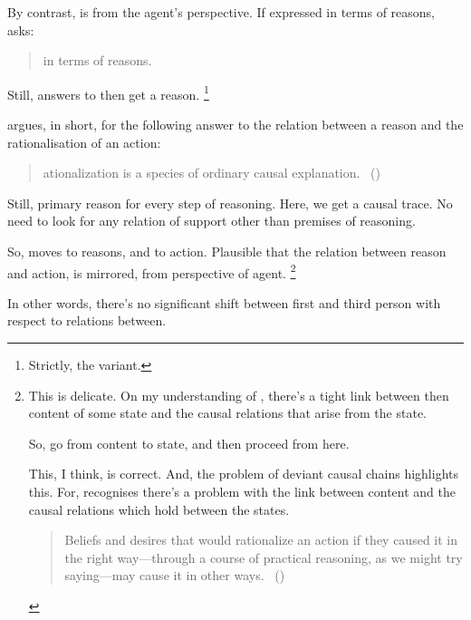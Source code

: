 \begin{note}
  By contrast, \qWhy{} is from the agent's perspective.
  If expressed in terms of reasons, \qWhy{} asks:

  \begin{quote}
    \color{red}
    \qWhy{} in terms of reasons.
  \end{quote}

  Still, answers to \qWhy{} then get a reason.%
  \footnote{
    Strictly, the variant.
  }

  \citeauthor{Davidson:1963aa} argues, in short, for the following answer to the relation between a reason and the rationalisation of an action:

  \begin{quote}
    \begin{enumerate}[label=\arabic*]
      [R]ationalization is a species of ordinary causal explanation.\newline
      \mbox{ }\hfill\mbox{(\citeyear[685]{Davidson:1963aa})}
    \end{enumerate}
  \end{quote}

  Still, primary reason for every step of reasoning.
  Here, we get a causal trace.
  No need to look for any relation of support other than premises of reasoning.

  So, \citeauthor{Davidson:1963aa} moves to reasons, and to action.
  Plausible that the relation between reason and action, is mirrored, from perspective of agent.%
  \footnote{
    This is delicate.
  On my understanding of \citeauthor{Davidson:1963aa}, there's a tight link between then content of some state and the causal relations that arise from the state.

  So, go from content to state, and then proceed from here.

  This, I think, is correct.
  And, the problem of deviant causal chains highlights this.
  For, \citeauthor{Davidson:1963aa} recognises there's a problem with the link between content and the causal relations which hold between the states.

  \begin{quote}
    Beliefs and desires that would rationalize an action if they caused it in the right way—through a course of practical reasoning, as we might try saying---may cause it in other ways.%
    \mbox{ }\hfill\mbox{(\citeyear[79]{Davidson:1973vd})}
  \end{quote}
  }

  In other words, there's no significant shift between first and third person with respect to relations between.


\end{note}

